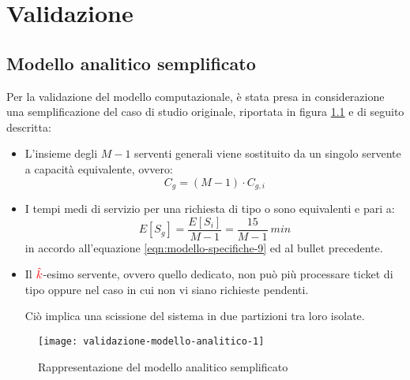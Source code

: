 \chapter{Validazione}\label{chp:validazione}
\section{Modello analitico semplificato}
Per la validazione del modello computazionale, è stata presa in considerazione una semplificazione del caso di studio originale, riportata in figura \ref{fig:validazione-modello-analitico-1} e di seguito descritta:
\begin{itemize}
\item L'insieme degli $M-1$ serventi generali viene sostituito da un singolo servente a capacità equivalente, ovvero:
\begin{equation}
C_g = (M-1)\cdot C_{g,i}
\end{equation}
\item I tempi medi di servizio per una richiesta di tipo \uo{} o \pp{} sono equivalenti e pari a:
\begin{equation}
E[S_g] = \frac{E[S_i]}{M-1} = \frac{15}{M-1}\ min
\end{equation} 
in accordo all'equazione \ref{eqn:modello-specifiche-9} ed al bullet precedente.
\item Il ${\color{red}\hat{k}}{}$-esimo servente, ovvero quello dedicato, non può più processare ticket di tipo \uo{} oppure \pp{} nel caso in cui non vi siano richieste \sr{} pendenti.

Ciò implica una scissione del sistema in due partizioni tra loro isolate.
\end{itemize}

\begin{figure}[ht]
\centering
\texttt{[image: validazione-modello-analitico-1]}
\caption{Rappresentazione del modello analitico semplificato}
\label{fig:validazione-modello-analitico-1}
\end{figure}

